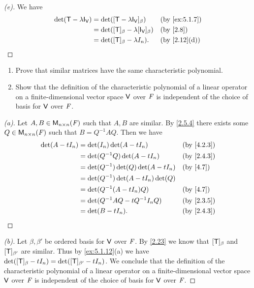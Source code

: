 \begin{proof}[(e)]
  We have
  \begin{align*}
    \det(\T - \lambda \IT[\V]) & = \det([\T - \lambda \IT[\V]]_{\beta})           &  & \text{(by \cref{ex:5.1.7})} \\
                               & = \det([\T]_{\beta} - \lambda [\IT[\V]]_{\beta}) &  & \text{(by \cref{2.8})}      \\
                               & = \det([\T]_{\beta} - \lambda I_n).              &  & \text{(by \cref{2.12}(d))}
  \end{align*}
\end{proof}

\begin{ex}\label{ex:5.1.12}
  \begin{enumerate}
    \item Prove that similar matrices have the same characteristic polynomial.
    \item Show that the definition of the characteristic polynomial of a linear operator on a finite-dimensional vector space \(\mathsf{V}\) over \(\mathit{F}\) is independent of the choice of basis for \(\mathsf{V}\) over \(\mathit{F}\).
  \end{enumerate}
\end{ex}

\begin{proof}[(a)]
  Let \(A, B \in \mathsf{M}_{{n} \times n}({\mathit{F}})\) such that \(A, B\) are similar.
  By \cref{2.5.4} there exists some \(Q \in \mathsf{M}_{{n} \times n}({\mathit{F}})\) such that \(B = Q^{-1} A Q\).
  Then we have
  \begin{align*}
    \det(A - t I_n) & = \det(I_n) \det(A - t I_n)            &  & \text{(by \cref{4.2.3})} \\
                    & = \det(Q^{-1} Q) \det(A - t I_n)       &  & \text{(by \cref{2.4.3})} \\
                    & = \det(Q^{-1}) \det(Q) \det(A - t I_n) &  & \text{(by \cref{4.7})}   \\
                    & = \det(Q^{-1}) \det(A - t I_n) \det(Q)                               \\
                    & = \det(Q^{-1} (A - t I_n) Q)           &  & \text{(by \cref{4.7})}   \\
                    & = \det(Q^{-1} A Q - t Q^{-1} I_n Q)    &  & \text{(by \cref{2.3.5})} \\
                    & = \det(B - t I_n).                     &  & \text{(by \cref{2.4.3})}
  \end{align*}
\end{proof}

\begin{proof}[(b)]
  Let \(\beta, \beta'\) be ordered basis for \(\mathsf{V}\) over \(\mathit{F}\).
  By \cref{2.23} we know that \([\mathsf{T}]_{\beta}\) and \([\mathsf{T}]_{\beta'}\) are similar.
  Thus by \cref{ex:5.1.12}(a) we have \(\det([\mathsf{T}]_{\beta} - t I_n) = \det([\mathsf{T}]_{\beta'} - t I_n)\).
  We conclude that the definition of the characteristic polynomial of a linear operator on a finite-dimensional vector space \(\mathsf{V}\) over \(\mathit{F}\) is independent of the choice of basis for \(\mathsf{V}\) over \(\mathit{F}\).
\end{proof}
